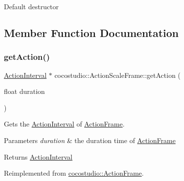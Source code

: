 Default destructor 

\subsection{Member Function Documentation}
\mbox{\label{classcocostudio_1_1ActionScaleFrame_a7835af6973dddcd7714efd7c45c9bc80}} 
\subsubsection{\texorpdfstring{get\+Action()}{getAction()}\hspace{0.1cm}{\footnotesize\ttfamily [1/2]}}
{\footnotesize\ttfamily \hyperlink{classActionInterval}{Action\+Interval} $\ast$ cocostudio\+::\+Action\+Scale\+Frame\+::get\+Action (\begin{DoxyParamCaption}\item[{float}]{duration }\end{DoxyParamCaption})\hspace{0.3cm}{\ttfamily [virtual]}}

Gets the \hyperlink{classActionInterval}{Action\+Interval} of \hyperlink{classcocostudio_1_1ActionFrame}{Action\+Frame}.


\begin{DoxyParams}{Parameters}
{\em duration} & the duration time of \hyperlink{classcocostudio_1_1ActionFrame}{Action\+Frame}\\
\hline
\end{DoxyParams}
\begin{DoxyReturn}{Returns}
\hyperlink{classActionInterval}{Action\+Interval} 
\end{DoxyReturn}


Reimplemented from \hyperlink{classcocostudio_1_1ActionFrame_a375216a44f6643d5e771299b1236dc51}{cocostudio\+::\+Action\+Frame}.

\mbox{\label{classcocostudio_1_1ActionScaleFrame_a7952170933c3dde44525f8917d2e661a}} 
